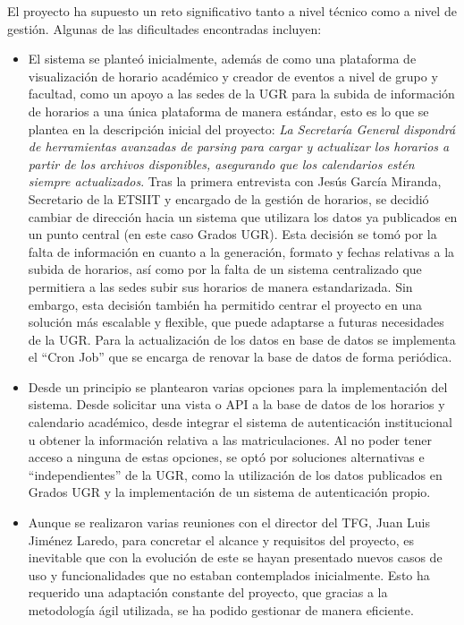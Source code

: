 El proyecto ha supuesto un reto significativo tanto a nivel técnico como a nivel de gestión. Algunas de las dificultades encontradas incluyen:
\begin{itemize}
    \item El sistema se planteó inicialmente, además de como una plataforma de visualización de horario académico y creador de eventos a nivel de grupo y facultad, como un apoyo a las sedes de la UGR para la subida de información de horarios a una única plataforma de manera estándar, esto es lo que se plantea en la descripción inicial del proyecto: \textit{La Secretaría General dispondrá de herramientas avanzadas de parsing para cargar y actualizar los horarios a partir de los archivos disponibles, asegurando que los calendarios estén siempre actualizados}. Tras la primera entrevista con Jesús García Miranda, Secretario de la ETSIIT y encargado de la gestión de horarios, se decidió cambiar de dirección hacia un sistema que utilizara los datos ya publicados en un punto central (en este caso Grados UGR).
    Esta decisión se tomó por la falta de información en cuanto a la generación, formato y fechas relativas a la subida de horarios, así como por la falta de un sistema centralizado que permitiera a las sedes subir sus horarios de manera estandarizada.
    Sin embargo, esta decisión también ha permitido centrar el proyecto en una solución más escalable y flexible, que puede adaptarse a futuras necesidades de la UGR. Para la actualización de los datos en base de datos se implementa el ``Cron Job'' que se encarga de renovar la base de datos de forma periódica.

    \item Desde un principio se plantearon varias opciones para la implementación del sistema. Desde solicitar una vista o API a la base de datos de los horarios y calendario académico, desde integrar el sistema de autenticación institucional u obtener la información relativa a las matriculaciones. Al no poder tener acceso a ninguna de estas opciones, se optó por soluciones alternativas e ``independientes'' de la UGR, como la utilización de los datos publicados en Grados UGR y la implementación de un sistema de autenticación propio.
    \item Aunque se realizaron varias reuniones con el director del TFG, Juan Luis Jiménez Laredo, para concretar el alcance y requisitos del proyecto, es inevitable que con la evolución de este se hayan presentado nuevos casos de uso y funcionalidades que no estaban contemplados inicialmente. Esto ha requerido una adaptación constante del proyecto, que gracias a la metodología ágil utilizada, se ha podido gestionar de manera eficiente.
\end{itemize}

